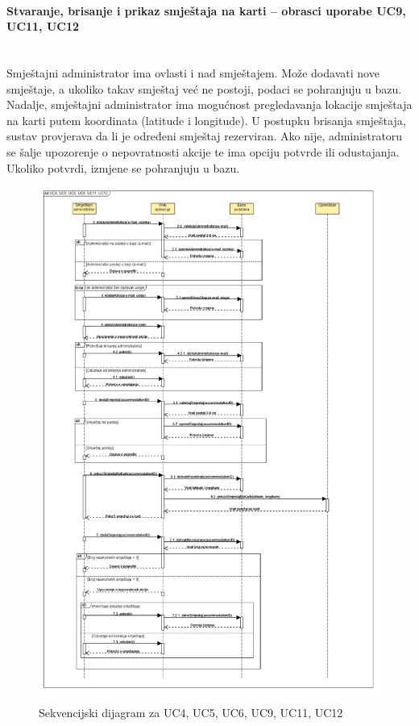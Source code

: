 				\paragraph{Stvaranje, brisanje i prikaz smještaja na karti – obrasci uporabe UC9, UC11, UC12 }\mbox{} \\
				Smještajni administrator ima ovlasti i nad smještajem. Može dodavati nove smještaje, a ukoliko takav smještaj već ne postoji, podaci se pohranjuju u bazu. Nadalje, smještajni administrator ima mogućnost pregledavanja lokacije smještaja na karti putem koordinata (latitude i longitude). U postupku brisanja smještaja, sustav provjerava da li je određeni smještaj rezerviran. Ako nije, administratoru se šalje upozorenje o nepovratnosti akcije te ima opciju potvrde ili odustajanja. Ukoliko potvrdi, izmjene se pohranjuju u bazu. 
				\begin{figure}[H]
					\includegraphics[scale=0.5]{slike/sd2.PNG} %
					\centering
					\caption{Sekvencijski dijagram za UC4, UC5, UC6, UC9, UC11, UC12}
					\label{fig:sd2} %
				\end{figure}
				
